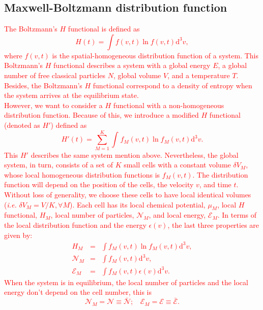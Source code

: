 \documentclass{article}
\begin{document}
\subsection{Maxwell-Boltzmann distribution function}
\textcolor{red}{The Boltzmann's $H$ functional is defined as
\begin{equation}
    H(t)=\int f(v,t) \ln f(v,t) \mathrm{d}^{3}v,
\end{equation}
where $f(v,t)$ is the spatial-homogeneous distribution function of a system. This Boltzmann's $H$ functional describes a system with a global energy $E$, a global number of free
classical particles $N$, global volume $V$, and a temperature $T$. 
Besides, the Boltzmann's $H$ functional correspond to a density of entropy when the system arrives at the equilibrium state.\\
However, we want to consider a $H$ functional with a non-homogeneous distribution function. Because of this, we introduce a modified $H$ functional (denoted as $H'$) defined as
\begin{equation}
   H'(t)=\sum_{M=1}^{K}\int_{}^{} f_M(v,t) \ln f_M(v,t)\mathrm{d}^3v  \label{CH2}.
\end{equation}
This $H'$ describes the same system mention above. Nevertheless, the global system, in turn, consists of a set of $K$ small cells with a constant volume $\delta V_M$, whose local homogeneous distribution functions is $f_{M}(v,t)$. The distribution function will depend on the position of the cells, the velocity $v$, and time $t$. Without loss of generality, we choose these cells to have
local identical volumes (\textit{i.e.} $\delta V_M = V/K, \forall M$). Each cell has its local chemical potential, $\mu_M$, local
$H$ functional, $H_M$, local number of particles, $\mathcal{N}_M$, and local energy, $\mathcal{E}_M$. In terms of the local distribution 
function and the energy $\epsilon(v)$, the last three properties are given by:
\begin{eqnarray}
    H_M &=&  \int f_M(v,t) \ln f_{M}(v,t) \mathrm{d}^{3}v \label{Hcell},\\
    {\mathcal{N}}_M&=& \int f_{M}(v ,t) \mathrm{d}^{3}v, \nonumber \\
{\mathcal{E}}_M&=& \int f_{M}(v,t)\epsilon(v) \mathrm{d}^{3}v.
\end{eqnarray}
When the system is in equilibrium, the local number of particles and the local energy don't depend on the cell number, this is
\begin{equation}
   {\mathcal{N}}_M=\mathcal{N}\equiv \bar{\mathcal{N}}; \ \ \ \  {\mathcal{E}}_M=\mathcal{E}\equiv \bar{\mathcal{E}}.

\end{equation}}
\end{document}

